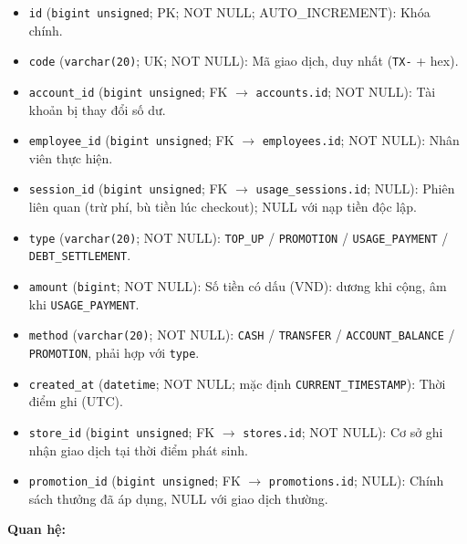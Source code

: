 \begin{itemize}

\item \texttt{id} (\texttt{bigint unsigned}; PK; NOT NULL; AUTO_INCREMENT): Khóa chính.

\item \texttt{code} (\texttt{varchar(20)}; UK; NOT NULL): Mã giao dịch, duy nhất (\texttt{TX-} + hex).

\item \texttt{account\_id} (\texttt{bigint unsigned}; FK $\rightarrow$ \texttt{accounts.id}; NOT NULL): Tài khoản bị thay đổi số dư.

\item \texttt{employee\_id} (\texttt{bigint unsigned}; FK $\rightarrow$ \texttt{employees.id}; NOT NULL): Nhân viên thực hiện.

\item \texttt{session\_id} (\texttt{bigint unsigned}; FK $\rightarrow$ \texttt{usage\_sessions.id}; NULL): Phiên liên quan (trừ phí, bù tiền lúc checkout); NULL với nạp tiền độc lập.

\item \texttt{type} (\texttt{varchar(20)}; NOT NULL): \texttt{TOP\_UP} / \texttt{PROMOTION} / \texttt{USAGE\_PAYMENT} / \texttt{DEBT\_SETTLEMENT}.

\item \texttt{amount} (\texttt{bigint}; NOT NULL): Số tiền có dấu (VND): dương khi cộng, âm khi \texttt{USAGE\_PAYMENT}.

\item \texttt{method} (\texttt{varchar(20)}; NOT NULL): \texttt{CASH} / \texttt{TRANSFER} / \texttt{ACCOUNT\_BALANCE} / \texttt{PROMOTION}, phải hợp với \texttt{type}.

\item \texttt{created\_at} (\texttt{datetime}; NOT NULL; mặc định \texttt{CURRENT\_TIMESTAMP}): Thời điểm ghi (UTC).

\item \texttt{store\_id} (\texttt{bigint unsigned}; FK $\rightarrow$ \texttt{stores.id}; NOT NULL): Cơ sở ghi nhận giao dịch tại thời điểm phát sinh.

\item \texttt{promotion\_id} (\texttt{bigint unsigned}; FK $\rightarrow$ \texttt{promotions.id}; NULL): Chính sách thưởng đã áp dụng, NULL với giao dịch thường.

\end{itemize}

\textbf{Quan hệ:}

